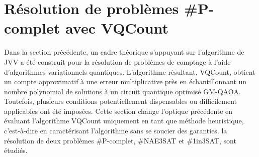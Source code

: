 \chapter{Résolution de problèmes \textsf{\#P}-complet avec VQCount}

Dans la section précédente, un cadre théorique s'appuyant sur l'algorithme de JVV a été construit pour la résolution de problèmes de comptage à l'aide d'algorithmes variationnels quantiques. L'algorithme résultant, VQCount, obtient un compte approximatif à une erreur multiplicative près en échantillonnant un nombre polynomial de solutions à un circuit quantique optimisé GM-QAOA. Toutefois, plusieurs conditions potentiellement dispensables ou difficilement applicables ont été imposées. Cette section change l'optique précédente en évaluant l'algorithme VQCount uniquement en tant que méthode heuristique, c'est-à-dire en caractérisant l'algorithme sans se soucier des garanties. la résolution de deux problèmes \textsf{\#P}-complet, \#NAE3SAT et \#1in3SAT, sont étudiés.

